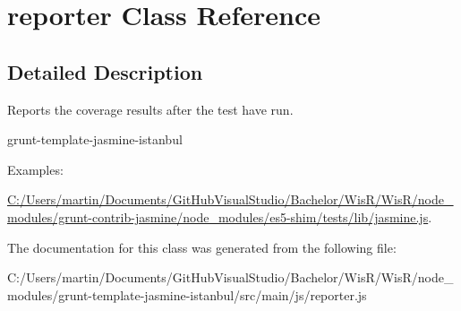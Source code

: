 \hypertarget{classreporter}{}\section{reporter Class Reference}
\label{classreporter}


\subsection{Detailed Description}
Reports the coverage results after the test have run.

grunt-\/template-\/jasmine-\/istanbul \begin{Desc}
\item[Examples\+: ]\par
\hyperlink{_c_1_2_users_2martin_2_documents_2_git_hub_visual_studio_2_bachelor_2_wis_r_2_wis_r_2node_moduledf1d3fccefe076e7cba2c20deacf125a}{C\+:/\+Users/martin/\+Documents/\+Git\+Hub\+Visual\+Studio/\+Bachelor/\+Wis\+R/\+Wis\+R/node\+\_\+modules/grunt-\/contrib-\/jasmine/node\+\_\+modules/es5-\/shim/tests/lib/jasmine.\+js}.\end{Desc}


The documentation for this class was generated from the following file\+:\begin{DoxyCompactItemize}
\item 
C\+:/\+Users/martin/\+Documents/\+Git\+Hub\+Visual\+Studio/\+Bachelor/\+Wis\+R/\+Wis\+R/node\+\_\+modules/grunt-\/template-\/jasmine-\/istanbul/src/main/js/reporter.\+js\end{DoxyCompactItemize}
